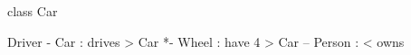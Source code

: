 \documentclass{scrartcl}
\begin{document}
\begin{plantuml}
class Car

Driver - Car : drives >
Car *- Wheel : have 4 >
Car -- Person : < owns
\end{plantuml}
\end{document}
